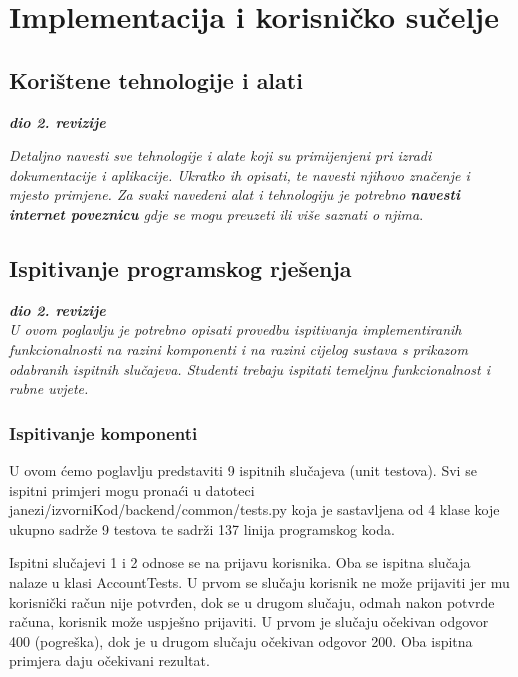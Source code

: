 \chapter{Implementacija i korisničko sučelje}
		
		
		\section{Korištene tehnologije i alati}
		
			\textbf{\textit{dio 2. revizije}}
			
			 \textit{Detaljno navesti sve tehnologije i alate koji su primijenjeni pri izradi dokumentacije i aplikacije. Ukratko ih opisati, te navesti njihovo značenje i mjesto primjene. Za svaki navedeni alat i tehnologiju je potrebno \textbf{navesti internet poveznicu} gdje se mogu preuzeti ili više saznati o njima}.
			
			
			\eject 
		
	
		\section{Ispitivanje programskog rješenja}
			
			\textbf{\textit{dio 2. revizije}}\\
			
			 \textit{U ovom poglavlju je potrebno opisati provedbu ispitivanja implementiranih funkcionalnosti na razini komponenti i na razini cijelog sustava s prikazom odabranih ispitnih slučajeva. Studenti trebaju ispitati temeljnu funkcionalnost i rubne uvjete.}
	
			
			\subsection{Ispitivanje komponenti}
			U ovom ćemo poglavlju predstaviti 9 ispitnih slučajeva (unit testova). Svi se ispitni primjeri mogu pronaći u datoteci janezi/izvorniKod/backend/common/tests.py koja je sastavljena od 4 klase koje ukupno sadrže 9 testova te sadrži 137 linija programskog koda.
			
			\vspace{5mm} %
			
			Ispitni slučajevi 1 i 2 odnose se na prijavu korisnika. Oba se ispitna slučaja nalaze u klasi AccountTests. U prvom se slučaju korisnik ne može prijaviti jer mu korisnički račun nije potvrđen, dok se u drugom slučaju, odmah nakon potvrde računa, korisnik može uspješno prijaviti. U prvom je slučaju očekivan odgovor 400 (pogreška), dok je u drugom slučaju očekivan odgovor 200. Oba ispitna primjera daju očekivani rezultat.
			
